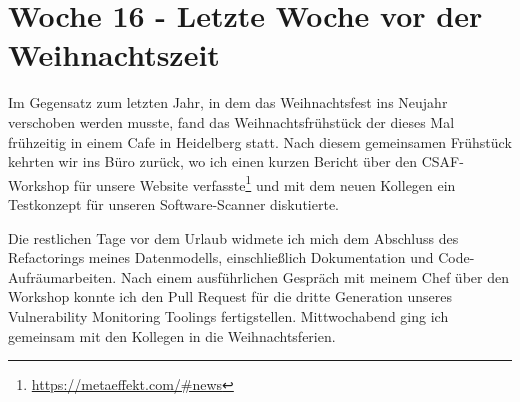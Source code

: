 \section{Woche 16 - Letzte Woche vor der Weihnachtszeit} \label{sec:bericht-wo-16}


\lweekdaymarginpar{\weekdayMondayLong}

Im Gegensatz zum letzten Jahr, in dem das Weihnachtsfest ins Neujahr verschoben werden musste, fand das Weihnachtsfrühstück der {\metaeffekt} dieses Mal frühzeitig in einem Cafe in Heidelberg statt.
Nach diesem gemeinsamen Frühstück kehrten wir ins Büro zurück, wo ich einen kurzen Bericht über den CSAF-Workshop für unsere Website verfasste\footnote{\url{https://metaeffekt.com/\#news}} und mit dem neuen Kollegen ein Testkonzept für unseren Software-Scanner diskutierte.

\sweekdaymarginpar{\weekdayTuesdayShort, \weekdayWednesdayShort}

Die restlichen Tage vor dem Urlaub widmete ich mich dem Abschluss des Refactorings meines Datenmodells, einschließlich Dokumentation und Code-Aufräumarbeiten.
Nach einem ausführlichen Gespräch mit meinem Chef über den Workshop konnte ich den Pull Request für die dritte Generation unseres Vulnerability Monitoring Toolings fertigstellen.
Mittwochabend ging ich gemeinsam mit den Kollegen in die Weihnachtsferien.
